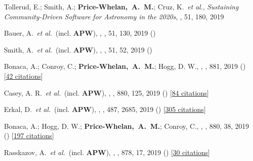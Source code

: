 \item[{\color{deemph}\scriptsize61}]Tollerud, E.; Smith, A.; \textbf{Price-Whelan,~A.~M.}; Cruz, K.~\textit{et al.}, \textit{Sustaining Community-Driven Software for Astronomy in the 2020s}, \baas, 51, 180, 2019

\item[{\color{deemph}\scriptsize60}]Bauer, A.~\textit{et al.}~(incl. \textbf{APW}), , \baas, 51, 130, 2019 ()

\item[{\color{deemph}\scriptsize59}]Smith, A.~\textit{et al.}~(incl. \textbf{APW}), , \baas, 51, 52, 2019 ()

\item[{\color{deemph}\scriptsize58}]Bonaca, A.; Conroy, C.; \textbf{Price-Whelan,~A.~M.}; Hogg, D. W., , \apj, 881, 2019 () [\href{http://adsabs.harvard.edu/abs/2019ApJ...881L..37B}{42 citations}]

\item[{\color{deemph}\scriptsize57}]Casey, A. R.~\textit{et al.}~(incl. \textbf{APW}), , \apj, 880, 125, 2019 () [\href{http://adsabs.harvard.edu/abs/2019ApJ...880..125C}{84 citations}]

\item[{\color{deemph}\scriptsize56}]Erkal, D.~\textit{et al.}~(incl. \textbf{APW}), , \mnras, 487, 2685, 2019 () [\href{http://adsabs.harvard.edu/abs/2019MNRAS.487.2685E}{305 citations}]

\item[{\color{deemph}\scriptsize55}]Bonaca, A.; Hogg, D. W.; \textbf{Price-Whelan,~A.~M.}; Conroy, C., , \apj, 880, 38, 2019 () [\href{http://adsabs.harvard.edu/abs/2019ApJ...880...38B}{197 citations}]

\item[{\color{deemph}\scriptsize54}]Rasskazov, A.~\textit{et al.}~(incl. \textbf{APW}), , \apj, 878, 17, 2019 () [\href{http://adsabs.harvard.edu/abs/2019ApJ...878...17R}{30 citations}]

